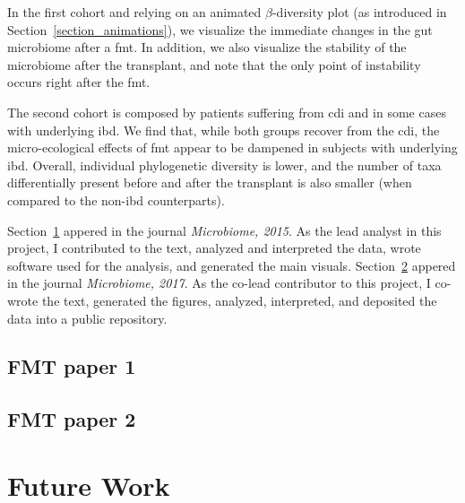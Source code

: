 \documentclass[12pt,chapterheads]{ucsd}
\begin{document}
In the first cohort and relying on an animated $\beta$-diversity plot (as 
introduced in Section~\ref{section_animations}), we visualize the immediate 
changes in the gut microbiome after a \gls{fmt}. In addition, we also visualize 
the stability of the microbiome after the transplant, and note that the only 
point of instability occurs right after the \gls{fmt}.

The second cohort is composed by patients suffering from \gls{cdi} and in some 
cases with underlying \gls{ibd}. We find that, while both groups recover from 
the \gls{cdi}, the micro-ecological effects of \gls{fmt} appear to be dampened 
in subjects with underlying \gls{ibd}. Overall, individual phylogenetic 
diversity is lower, and the number of taxa differentially present before and 
after the transplant is also smaller (when compared to the non-\gls{ibd} 
counterparts).

Section~\ref{section_moviefmt} appered in the journal \textsl{Microbiome, 
2015}. As the lead analyst in this project, I contributed to the text, analyzed 
and interpreted the data, wrote software used for the analysis, and generated 
the main visuals.  Section~\ref{section_fmt} appered in the journal 
\textsl{Microbiome, 2017}. As the co-lead contributor to this project, I 
co-wrote the text, generated the figures, analyzed, interpreted, and deposited 
the data into a public repository.

\ifdefined\RELEASE
    
    
\else
    \section{FMT paper 1}\label{section_moviefmt}
    \section{FMT paper 2}\label{section_fmt}
\fi

\chapter{Future Work}



\appendix


\printindex %


\end{document}
